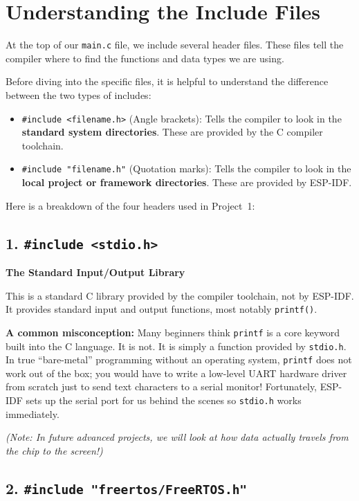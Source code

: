 \documentclass[11pt]{article}
\begin{document}
\section*{Understanding the Include Files}

At the top of our \texttt{main.c} file, we include several header files. These files tell the compiler where to find the functions and data types we are using.

Before diving into the specific files, it is helpful to understand the difference between the two types of includes:

\begin{itemize}
    \item \texttt{\#include <filename.h>} (Angle brackets): Tells the compiler to look in the \textbf{standard system directories}. These are provided by the C compiler toolchain.
    
    \item \texttt{\#include "filename.h"} (Quotation marks): Tells the compiler to look in the \textbf{local project or framework directories}. These are provided by ESP-IDF.
\end{itemize}

Here is a breakdown of the four headers used in Project~1:

\subsection*{1. \texttt{\#include <stdio.h>}}

\textbf{The Standard Input/Output Library}

This is a standard C library provided by the compiler toolchain, not by ESP-IDF. It provides standard input and output functions, most notably \texttt{printf()}.

\textbf{A common misconception:} Many beginners think \texttt{printf} is a core keyword built into the C language. It is not. It is simply a function provided by \texttt{stdio.h}. In true ``bare-metal'' programming without an operating system, \texttt{printf} does not work out of the box; you would have to write a low-level UART hardware driver from scratch just to send text characters to a serial monitor! Fortunately, ESP-IDF sets up the serial port for us behind the scenes so \texttt{stdio.h} works immediately.

\emph{(Note: In future advanced projects, we will look at how data actually travels from the chip to the screen!)}

\subsection*{2. \texttt{\#include "freertos/FreeRTOS.h"}}
\end{document}
